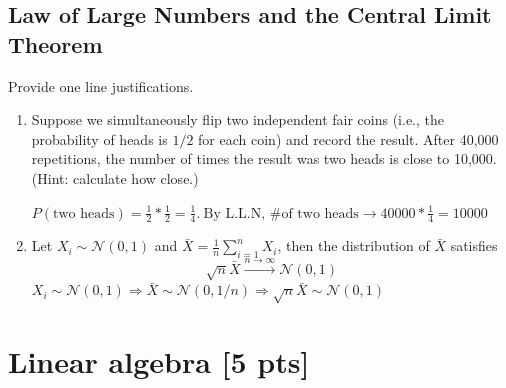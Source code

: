 \documentclass[a4paper]{article}
\theoremstyle{definition}
\newenvironment{soln}{
    \leavevmode\color{blue}\ignorespaces
}{}
\begin{document}
\subsection{Law of Large Numbers and the Central Limit Theorem}
Provide one line justifications.
\begin{enumerate}
\item Suppose we simultaneously flip two independent fair coins (i.e., the probability of heads is $1/2$ for each coin)
  and record the result. After 40,000 repetitions, the number
  of times the result was two heads is close to 10,000.  (Hint: calculate how close.)
  
  \begin{soln}  $P(\text{two heads})=\frac{1}{2}*\frac{1}{2}=\frac{1}{4}.\ \text{By L.L.N, \# of two heads}\rightarrow 40000*\frac{1}{4}=10000$ \end{soln}
  
\item Let $X_i\sim\mathcal{N}(0, 1)$ and $\bar{X} = \frac{1}{n}\sum_{i=1}^n X_i$, then the distribution of $\bar{X}$ satisfies 
  $$\sqrt{n}\bar{X}\overset{n\rightarrow\infty}{\longrightarrow}\mathcal{N}(0, 1)$$
  \begin{soln} $X_i\sim\mathcal{N}(0, 1)\Longrightarrow \bar{X}\sim\mathcal{N}(0, 1/n)\Longrightarrow \sqrt{n}\bar{X}\sim\mathcal{N}(0, 1)$ \end{soln}
  
\end{enumerate}



\section{Linear algebra [5 pts]}
\end{document}
